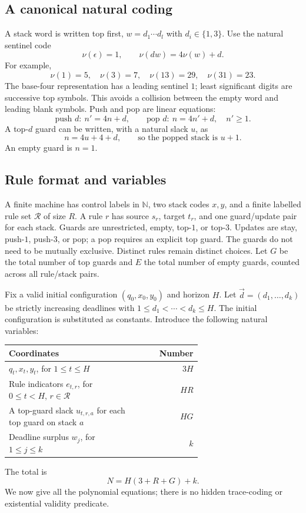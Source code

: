 \documentclass[11pt,letterpaper]{article}
\theoremstyle{definition}
\theoremstyle{remark}
\newcommand{\N}{\mathbb N}
\newcommand{\rules}{\mathcal R}
\newcommand{\1}{\mathbf 1}
\begin{document}
\subsection{A canonical natural coding}
A stack word is written top first, $w=d_1\cdots d_l$ with $d_i\in\{1,3\}$.
Use the natural sentinel code
\begin{equation}\label{lbh:eq:stackcode}
 \nu(\epsilon)=1,\qquad \nu(dw)=4\nu(w)+d.
\end{equation}
For example,
\[
 \nu(1)=5,\quad \nu(3)=7,\quad\nu(13)=29,\quad\nu(31)=23.
\]
The base-four representation has a leading sentinel $1$; least significant
digits are successive top symbols. This avoids a collision between the
empty word and leading blank symbols. Push and pop are linear equations:
\[
 \text{push }d:\ n'=4n+d,
 \qquad
 \text{pop }d:\ n=4n'+d,\quad n'\ge1.
\]
A top-$d$ guard can be written, with a natural slack $u$, as
\begin{equation}\label{lbh:eq:top-slack}
 n=4u+4+d,\qquad\text{so the popped stack is }u+1.
\end{equation}
An empty guard is $n=1$.

\subsection{Rule format and variables}
A finite machine has control labels in $\N$, two stack codes $x,y$, and a
finite labelled rule set $\rules$ of size $R$. A rule $r$ has source
$s_r$, target $t_r$, and one guard/update pair for each stack. Guards are
unrestricted, empty, top-$1$, or top-$3$. Updates are stay, push-$1$,
push-$3$, or pop; a pop requires an explicit top guard. The guards do not
need to be mutually exclusive. Distinct rules remain distinct choices.
Let $G$ be the total number of top guards and $E$ the total number of empty
guards, counted across all rule/stack pairs.

Fix a valid initial configuration $(q_0,x_0,y_0)$ and horizon $H$.
Let $\vec d=(d_1,\ldots,d_k)$ be strictly increasing deadlines with
$1\le d_1<\cdots<d_k\le H$. The initial configuration is substituted as
constants. Introduce the following natural variables:
\begin{center}
\begin{tabular}{@{}p{0.65\linewidth}r@{}}
\toprule
Coordinates & Number\\
\midrule
$q_t,x_t,y_t$, for $1\le t\le H$ & $3H$\\
Rule indicators $e_{t,r}$, for $0\le t<H$, $r\in\rules$ & $HR$\\
A top-guard slack $u_{t,r,a}$ for each top guard on stack $a$ & $HG$\\
Deadline surplus $w_j$, for $1\le j\le k$ & $k$\\
\bottomrule
\end{tabular}
\end{center}
The total is
\begin{equation}\label{lbh:eq:Ncount}
 N=H(3+R+G)+k.
\end{equation}
We now give all the polynomial equations; there is no hidden trace-coding
or existential validity predicate.
\end{document}
